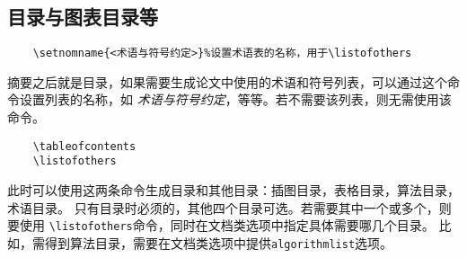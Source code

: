 \documentclass[figurelist,tablelist,algorithmlist,nomlist,masters]{seuthesix}
\begin{document}
\subsection{目录与图表目录等}
{\color{magenta}
	\begin{verbatim}
	\setnomname{<术语与符号约定>}%设置术语表的名称，用于\listofothers
	\end{verbatim}
}
摘要之后就是目录，如果需要生成论文中使用的术语和符号列表，可以通过这个命令设置列表的名称，如
\textit{术语与符号约定}，等等。若不需要该列表，则无需使用该命令。

{\color{magenta}
	\begin{verbatim}
	\tableofcontents
	\listofothers
	\end{verbatim}
}
此时可以使用这两条命令生成目录和其他目录：插图目录，表格目录，算法目录，术语目录。
只有目录时必须的，其他四个目录可选。若需要其中一个或多个，则要使用
\verb+\listofothers+命令，同时在文档类选项中指定具体需要哪几个目录。
比如，需得到算法目录，需要在文档类选项中提供\texttt{algorithmlist}选项。
\end{document}
